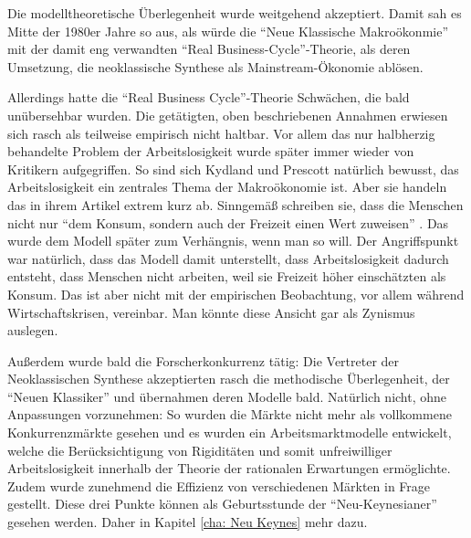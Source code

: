 Die modelltheoretische Überlegenheit wurde weitgehend akzeptiert. Damit sah es Mitte der 1980er Jahre so aus, als würde die "`Neue Klassische Makroökonmie"' mit der damit eng verwandten "`Real Business-Cycle"'-Theorie, als deren Umsetzung,  die neoklassische Synthese als Mainstream-Ökonomie ablösen.

Allerdings hatte die "`Real Business Cycle"'-Theorie Schwächen, die bald unübersehbar wurden. Die getätigten, oben beschriebenen Annahmen erwiesen sich rasch als teilweise empirisch nicht haltbar. 
Vor allem das nur halbherzig behandelte Problem der Arbeitslosigkeit wurde später immer wieder von Kritikern aufgegriffen. So sind sich Kydland und Prescott natürlich bewusst, das Arbeitslosigkeit ein zentrales Thema der Makroökonomie ist. Aber sie handeln das in ihrem Artikel extrem kurz ab. Sinngemäß schreiben sie, dass die Menschen nicht nur "`dem Konsum, sondern auch der Freizeit einen Wert zuweisen"' \parencite[S. 1345]{Kydland1982}. Das wurde dem Modell später zum Verhängnis, wenn man so will. Der Angriffspunkt war natürlich, dass das Modell damit unterstellt, dass Arbeitslosigkeit dadurch entsteht, dass Menschen nicht arbeiten, weil sie Freizeit höher einschätzten als Konsum.
Das ist aber nicht mit der empirischen Beobachtung, vor allem während Wirtschaftskrisen, vereinbar. Man könnte diese Ansicht gar als Zynismus auslegen.

Außerdem wurde bald die Forscherkonkurrenz tätig: Die Vertreter der Neoklassischen Synthese akzeptierten rasch die methodische Überlegenheit, der "`Neuen Klassiker"' und übernahmen deren Modelle bald. Natürlich nicht, ohne Anpassungen vorzunehmen: So wurden die Märkte nicht mehr als vollkommene Konkurrenzmärkte gesehen und es wurden ein Arbeitsmarktmodelle entwickelt, welche die Berücksichtigung von Rigiditäten und somit unfreiwilliger Arbeitslosigkeit innerhalb der Theorie der rationalen Erwartungen ermöglichte. Zudem wurde zunehmend die Effizienz von verschiedenen Märkten in Frage gestellt. Diese drei Punkte können als Geburtsstunde der "`Neu-Keynesianer"' gesehen werden. Daher in Kapitel \ref{cha: Neu Keynes} mehr dazu.

